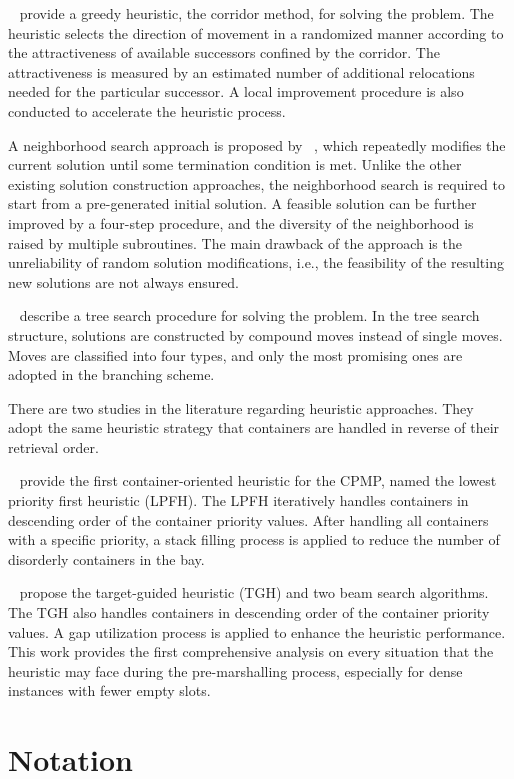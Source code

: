 \documentclass[review,3p,times,12pt,number]{elsarticle}\usepackage{amsmath}\usepackage{amssymb}
\renewcommand{\citet}[1]{\citeauthor{#1}~\citep{#1}}
\begin{document}
\citet{cas2009} provide a greedy heuristic, the corridor method, for solving the problem. The heuristic selects the direction of movement in a randomized manner according to the attractiveness of available successors confined by the corridor. The attractiveness is measured by an estimated number of additional relocations needed for the particular successor.
A local improvement procedure is also conducted to accelerate the heuristic process.

A neighborhood search approach is proposed by \citet{lee2009}, which repeatedly modifies the current solution until some termination condition is met. Unlike the other existing solution construction approaches, the neighborhood search  is required to start from a pre-generated initial solution.
A feasible solution can be further improved by a four-step procedure, and the diversity of the neighborhood is raised by multiple subroutines. The main drawback of the approach is the unreliability of random solution modifications, i.e., the feasibility of the resulting new solutions are not always ensured.

\citet{bort2012} describe a tree search procedure for solving the problem.
In the tree search structure, solutions are constructed by compound moves  instead of single moves. Moves are classified into four types, and only the most promising ones are adopted in the branching scheme.

There are two studies in the literature regarding heuristic approaches. They adopt the same heuristic strategy that containers are handled in reverse of their retrieval order.

\citet{exp2012} provide the first container-oriented heuristic for the CPMP, named the lowest priority first heuristic (LPFH). The LPFH iteratively handles containers in descending order of the container priority values. After handling all containers with a specific priority, a stack filling process is applied to reduce the number of disorderly containers in the bay.

\citet{wang2015} propose the target-guided heuristic (TGH) and two beam search algorithms. The TGH also handles containers in descending order of the container priority values. A gap utilization process is applied to enhance the heuristic performance. This work provides the first comprehensive analysis on every situation that the heuristic may face during the pre-marshalling process, especially for dense instances with fewer empty slots.

\section{Notation}
\label{sec:notation}
\end{document}
